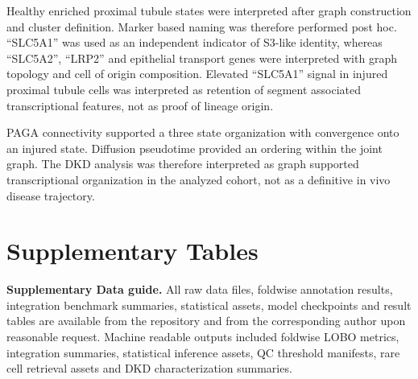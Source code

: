 \documentclass[11pt]{article}
\begin{document}
Healthy enriched proximal tubule states were interpreted after graph construction and cluster definition. Marker based naming was therefore performed post hoc. ``SLC5A1'' was used as an independent indicator of S3-like identity, whereas ``SLC5A2'', ``LRP2'' and epithelial transport genes were interpreted with graph topology and cell of origin composition. Elevated ``SLC5A1'' signal in injured proximal tubule cells was interpreted as retention of segment associated transcriptional features, not as proof of lineage origin.

PAGA connectivity supported a three state organization with convergence onto an injured state. Diffusion pseudotime provided an ordering within the joint graph. The DKD analysis was therefore interpreted as graph supported transcriptional organization in the analyzed cohort, not as a definitive in vivo disease trajectory.

\clearpage

\section*{Supplementary Tables}

\noindent\textbf{Supplementary Data guide.} All raw data files, foldwise annotation results, integration benchmark summaries, statistical assets, model checkpoints and result tables are available from the repository and from the corresponding author upon reasonable request. Machine readable outputs included foldwise LOBO metrics, integration summaries, statistical inference assets, QC threshold manifests, rare cell retrieval assets and DKD characterization summaries.

\FloatBarrier
\end{document}
